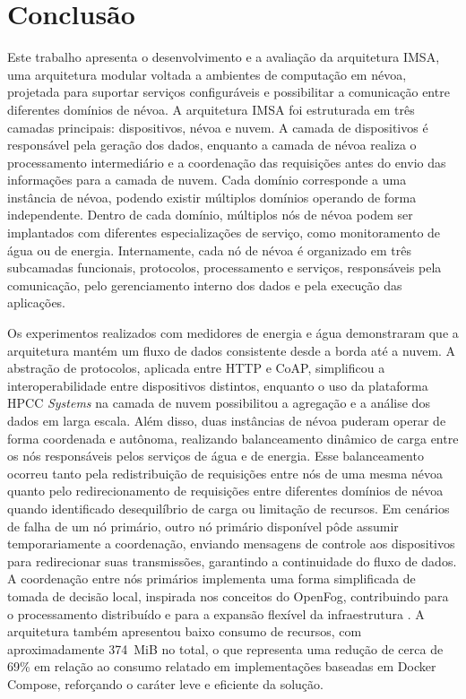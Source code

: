 \chapter{Conclusão}\label{cap:conclusao}

Este trabalho apresenta o desenvolvimento e a avaliação da arquitetura \gls{IMSA}, uma arquitetura modular voltada a ambientes de computação em névoa, projetada para suportar serviços configuráveis e possibilitar a comunicação entre diferentes domínios de névoa. A arquitetura \gls{IMSA} foi estruturada em três camadas principais: dispositivos, névoa e nuvem. A camada de dispositivos é responsável pela geração dos dados, enquanto a camada de névoa realiza o processamento intermediário e a coordenação das requisições antes do envio das informações para a camada de nuvem. Cada domínio corresponde a uma instância de névoa, podendo existir múltiplos domínios operando de forma independente. Dentro de cada domínio, múltiplos nós de névoa podem ser implantados com diferentes especializações de serviço, como monitoramento de água ou de energia. Internamente, cada nó de névoa é organizado em três subcamadas funcionais, protocolos, processamento e serviços, responsáveis pela comunicação, pelo gerenciamento interno dos dados e pela execução das aplicações.

Os experimentos realizados com medidores de energia e água demonstraram que a arquitetura mantém um fluxo de dados consistente desde a borda até a nuvem. A abstração de protocolos, aplicada entre \gls{HTTP} e \gls{CoAP}, simplificou a interoperabilidade entre dispositivos distintos, enquanto o uso da plataforma \gls{HPCC} \textit{Systems} na camada de nuvem possibilitou a agregação e a análise dos dados em larga escala. Além disso, duas instâncias de névoa puderam operar de forma coordenada e autônoma, realizando balanceamento dinâmico de carga entre os nós responsáveis pelos serviços de água e de energia. Esse balanceamento ocorreu tanto pela redistribuição de requisições entre nós de uma mesma névoa quanto pelo redirecionamento de requisições entre diferentes domínios de névoa quando identificado desequilíbrio de carga ou limitação de recursos. Em cenários de falha de um nó primário, outro nó primário disponível pôde assumir temporariamente a coordenação, enviando mensagens de controle aos dispositivos para redirecionar suas transmissões, garantindo a continuidade do fluxo de dados. A coordenação entre nós primários implementa uma forma simplificada de tomada de decisão local, inspirada nos conceitos do OpenFog, contribuindo para o processamento distribuído e para a expansão flexível da infraestrutura \cite{openfog2018}. A arquitetura também apresentou baixo consumo de recursos, com aproximadamente 374~MiB no total, o que representa uma redução de cerca de 69\% em relação ao consumo relatado em implementações baseadas em Docker Compose, reforçando o caráter leve e eficiente da solução.

